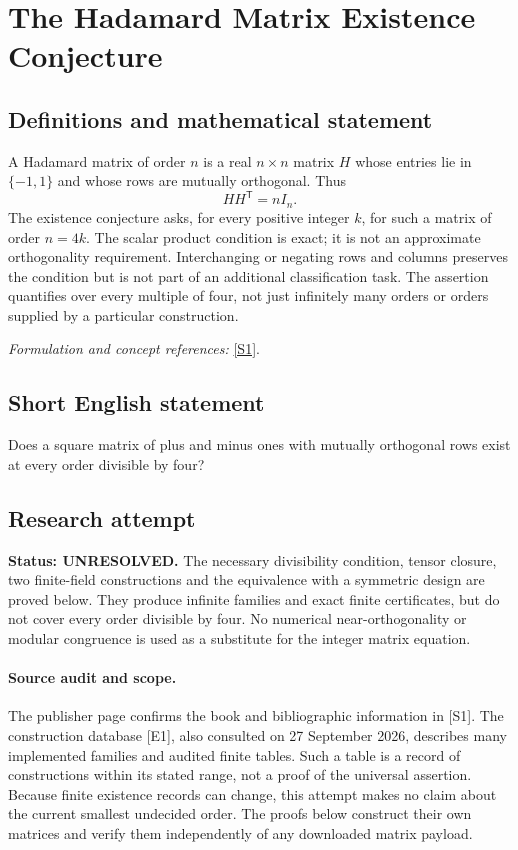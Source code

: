 \documentclass[11pt]{article}
\begin{document}
\section*{\texorpdfstring{The Hadamard Matrix Existence Conjecture}{The Hadamard Matrix Existence Conjecture}}\label{338}
\subsection{Definitions and mathematical statement}
A Hadamard matrix of order $n$ is a real $n\times n$ matrix $H$ whose entries lie in $\{-1,1\}$ and whose rows are mutually orthogonal. Thus
\[
 HH^{\mathsf T}=nI_n.
\]
The existence conjecture asks, for every positive integer $k$, for such a matrix of order $n=4k$. The scalar product condition is exact; it is not an approximate orthogonality requirement. Interchanging or negating rows and columns preserves the condition but is not part of an additional classification task. The assertion quantifies over every multiple of four, not just infinitely many orders or orders supplied by a particular construction.
\par\smallskip\textit{Formulation and concept references:} \href{https://press.princeton.edu/books/hardcover/9780691119212/hadamard-matrices-and-their-applications}{[S1]}.

\subsection{Short English statement}
Does a square matrix of plus and minus ones with mutually orthogonal rows exist at every order divisible by four?
\subsection{Research attempt}
\textbf{Status: UNRESOLVED.} The necessary divisibility condition, tensor closure, two finite-field constructions and the equivalence with a symmetric design are proved below. They produce infinite families and exact finite certificates, but do not cover every order divisible by four. No numerical near-orthogonality or modular congruence is used as a substitute for the integer matrix equation.

\paragraph{Source audit and scope.}
The publisher page confirms the book and bibliographic information in [S1]. The construction database [E1], also consulted on 27 September 2026, describes many implemented families and audited finite tables. Such a table is a record of constructions within its stated range, not a proof of the universal assertion. Because finite existence records can change, this attempt makes no claim about the current smallest undecided order. The proofs below construct their own matrices and verify them independently of any downloaded matrix payload.
\end{document}
